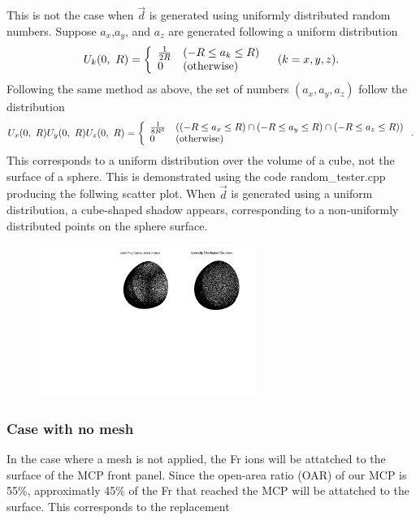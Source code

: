 \documentclass{article}
\begin{document}
This is not the case when $\vec{d}$ is generated using uniformly distributed random numbers. Suppose $a_x$,$a_y$, and $a_z$ are generated following a uniform distribution
$$
U_k(0,\ R) = \left\{
\begin{array}{ll}
	\frac{1}{2R} & (-R \le a_k \le R) \\
	0 & ({\rm otherwise})
\end{array} \right. \, \, \, \, \, (k = x, y, z).
$$
Following the same method as above, the set of numbers $(a_x, a_y, a_z)$ follow the distribution
$$
U_x(0,\ R) U_y(0,\ R) U_z(0,\ R) = \left\{
\begin{array}{ll}
	\frac{1}{8R^3} & \left( (-R \le a_x \le R) \cap (-R \le a_y \le R) \cap (-R \le a_z \le R) \right) \\
	0 & ({\rm otherwise})
\end{array} \right. .
$$
This corresponds to a uniform distribution over the volume of a cube, not the surface of a sphere. This is demonstrated using the code random\_tester.cpp producing the follwing scatter plot. When $\vec{d}$ is generated using a uniform distribution, a cube-shaped shadow appears, corresponding to a non-uniformly distributed points on the sphere surface.

\begin{figure}[H]
  \begin{center}
    \includegraphics[width=7.0cm,angle=-90]{./random_tester.pdf}
  \end{center}
\end{figure}




\subsubsection{Case with no mesh}
In the case where a mesh is not applied, the Fr ions will be attatched to the surface of the MCP front panel. Since the open-area ratio (OAR) of our MCP is 55\%, approximatly 45\% of the Fr that reached the MCP will be attatched to the surface. This corresponds to the replacement
\end{document}
